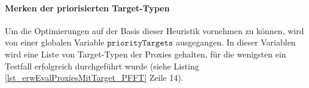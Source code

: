 
\paragraph{Merken der priorisierten Target-Typen}
\noindent
\newline
Um die Optimierungen auf der Basis dieser Heuristik vornehmen zu können, wird von einer globalen Variable $\texttt{priorityTargets}$ ausgegangen. In dieser Variablen wird eine Liste von Target-Typen der Proxies gehalten, für die wenigsten ein Testfall erfolgreich durchgeführt wurde (siehe Listing \ref{lst_erwEvalProxiesMitTarget_PFFT} Zeile 14).

